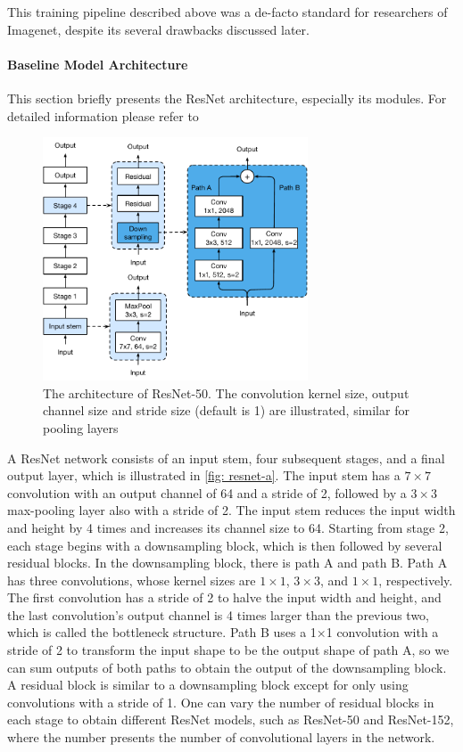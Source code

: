 This training pipeline described above was a de-facto standard for researchers of Imagenet, despite its several drawbacks discussed later. 

\paragraph{Baseline Model Architecture}
This section briefly presents the ResNet architecture, especially its modules. For detailed information please refer to \cite{he2016deep_resnetv1}


\begin{figure}[ht!]
    \centering
    \includegraphics[width=0.7\textwidth]{images/resnet-a.pdf}
    \caption{The architecture of ResNet-50. The convolution kernel size, output channel size and stride size (default is 1) are illustrated, similar for pooling layers}
    \label{fig: resnet-a}
  \end{figure}


A ResNet network consists of an input stem, four subsequent stages, and a final output layer, which is illustrated in \autoref{fig: resnet-a}. The input stem has a $7 \times 7$ convolution with an output channel of 64 and a stride of 2, followed by a $3 \times 3$ max-pooling layer also with a stride of 2. The input stem reduces the input width and height by 4 times and increases its channel size to 64. 
Starting from stage 2, each stage begins with a downsampling block, which is then followed by several residual blocks. In the downsampling block, there is path A and path B. Path A has three convolutions, whose kernel sizes are $1 \times 1$, $3 \times 3$, and $1 \times 1$, respectively. The first convolution has a stride of 2 to halve the input width and height, and the last convolution’s output channel is 4 times larger than the previous two, which is called the bottleneck structure. Path B uses a 1×1 convolution with a stride of 2 to transform the input shape to be the output shape of path A, so we can sum outputs of both paths to obtain the output of the downsampling block. A residual block is similar to a downsampling block except for only using convolutions with a stride of 1.
One can vary the number of residual blocks in each stage to obtain different ResNet models, such as ResNet-50 and ResNet-152, where the number presents the number of convolutional layers in the network.


